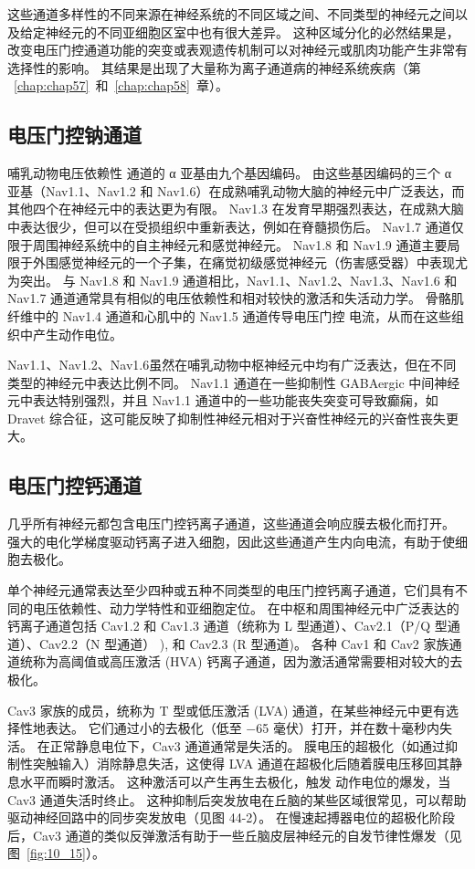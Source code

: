 这些通道多样性的不同来源在神经系统的不同区域之间、不同类型的神经元之间以及给定神经元的不同亚细胞区室中也有很大差异。
这种区域分化的必然结果是，改变电压门控通道功能的突变或表观遗传机制可以对神经元或肌肉功能产生非常有选择性的影响。
其结果是出现了大量称为离子通道病的神经系统疾病（第 ~\ref{chap:chap57}~和~\ref{chap:chap58}~章）。



\subsection{电压门控钠通道}

哺乳动物电压依赖性  通道的 α 亚基由九个基因编码。 由这些基因编码的三个 α 亚基（Nav1.1、Nav1.2 和 Nav1.6）在成熟哺乳动物大脑的神经元中广泛表达，而其他四个在神经元中的表达更为有限。 Nav1.3 在发育早期强烈表达，在成熟大脑中表达很少，但可以在受损组织中重新表达，例如在脊髓损伤后。 Nav1.7 通道仅限于周围神经系统中的自主神经元和感觉神经元。
Nav1.8 和 Nav1.9 通道主要局限于外围感觉神经元的一个子集，在痛觉初级感觉神经元（伤害感受器）中表现尤为突出。
与 Nav1.8 和 Nav1.9 通道相比，Nav1.1、Nav1.2、Nav1.3、Nav1.6 和 Nav1.7 通道通常具有相似的电压依赖性和相对较快的激活和失活动力学。 
骨骼肌纤维中的 Nav1.4 通道和心肌中的 Nav1.5 通道传导电压门控  电流，从而在这些组织中产生动作电位。


Nav1.1、Nav1.2、Nav1.6虽然在哺乳动物中枢神经元中均有广泛表达，但在不同类型的神经元中表达比例不同。
Nav1.1 通道在一些抑制性 GABAergic 中间神经元中表达特别强烈，并且 Nav1.1 通道中的一些功能丧失突变可导致癫痫，如 Dravet 综合征，这可能反映了抑制性神经元相对于兴奋性神经元的兴奋性丧失更大。



\subsection{电压门控钙通道}

几乎所有神经元都包含电压门控钙离子通道，这些通道会响应膜去极化而打开。
强大的电化学梯度驱动钙离子进入细胞，因此这些通道产生内向电流，有助于使细胞去极化。


单个神经元通常表达至少四种或五种不同类型的电压门控钙离子通道，它们具有不同的电压依赖性、动力学特性和亚细胞定位。
在中枢和周围神经元中广泛表达的钙离子通道包括 Cav1.2 和 Cav1.3 通道（统称为 L 型通道）、Cav2.1（P/Q 型通道）、Cav2.2（N 型通道） ), 和 Cav2.3 (R 型通道)。
各种 Cav1 和 Cav2 家族通道统称为高阈值或高压激活 (HVA) 钙离子通道，因为激活通常需要相对较大的去极化。


Cav3 家族的成员，统称为 T 型或低压激活 (LVA) 通道，在某些神经元中更有选择性地表达。
它们通过小的去极化（低至 −65 毫伏）打开，并在数十毫秒内失活。
在正常静息电位下，Cav3 通道通常是失活的。
膜电压的超极化（如通过抑制性突触输入）消除静息失活，这使得 LVA 通道在超极化后随着膜电压移回其静息水平而瞬时激活。 
这种激活可以产生再生去极化，触发  动作电位的爆发，当 Cav3 通道失活时终止。 
这种抑制后突发放电在丘脑的某些区域很常见，可以帮助驱动神经回路中的同步突发放电（见图 44-2）。 
在慢速起搏器电位的超极化阶段后，Cav3 通道的类似反弹激活有助于一些丘脑皮层神经元的自发节律性爆发（见图~\ref{fig:10_15}）。



